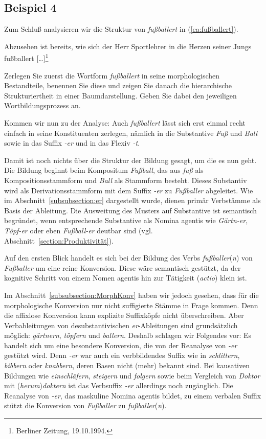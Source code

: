 \subsection{Beispiel 4}\label{subsection:Bsp4Wb}

Zum Schluß analysieren wir die Struktur von \textit{fußballert} in (\ref{ea:fußballert}).

\ea \label{ea:fußballert} Abzusehen ist bereits, wie sich der Herr Sportlehrer in die Herzen seiner Jungs fußballert [\ldots{}]\footnote{Berliner Zeitung, 19.10.1994.}
\z 

Zerlegen Sie zuerst die Wortform \textit{fußballert} in seine morphologischen Bestandteile, benennen Sie diese und zeigen Sie danach die hierarchische Strukturiertheit in einer Baumdarstellung. Geben Sie dabei den jeweiligen Wortbildungsprozess an.


Kommen wir nun zu der Analyse: Auch \textit{fußballert} lässt sich erst einmal recht einfach in seine Konstituenten zerlegen, nämlich in die Substantive \textit{Fuß} und \textit{Ball} sowie in das Suffix \textit{-er} und in das Flexiv \textit{-t}. 

Damit ist noch nichts über die Struktur der Bildung gesagt, um die es nun geht. Die Bildung beginnt beim Kompositum \textit{Fußball}, das aus \textit{fuß} als Kompositionsstammform und \textit{Ball} als Stammform besteht. Dieses Substantiv wird als Derivationsstammform mit dem  Suffix \textit{-er} zu \textit{Fußballer} abgeleitet. Wie im Abschnitt~\ref{subsubsection:er} dargestellt wurde, dienen primär Verbstämme als Basis der Ableitung. Die Ausweitung des Musters auf Substantive ist semantisch begründet, wenn entsprechende Substantive als Nomina agentis wie \textit{Gärtn-er}, \textit{Töpf-er} oder eben \textit{Fußball-er} deutbar sind (vgl. Abschnitt~\ref{section:Produktivität}). 

Auf den ersten Blick handelt es sich bei der Bildung des Verbs \textit{fußballer}(\textit{n}) von \textit{Fußballer} um eine reine Konversion. Diese wäre semantisch gestützt, da der kognitive Schritt von einem Nomen agentis hin zur Tätigkeit (\textit{actio}) klein ist.

Im Abschnitt~\ref{subsubsection:MorphKonv} haben wir jedoch gesehen, dass für die morphologische Konversion nur nicht suffigierte Stämme in Frage kommen. Denn die affixlose Konversion kann explizite Suffixköpfe nicht überschreiben. Aber Verbableitungen von desubstantivischen \textit{er}-Ableitungen sind grundsätzlich möglich: \textit{gärtnern}, \textit{töpfern} und \textit{ballern}. Deshalb schlagen wir Folgendes vor: Es handelt sich um eine besondere Konversion, die von der Reanalyse von \textit{-er} gestützt wird. Denn \textit{-er} war auch ein verbbildendes Suffix wie in \textit{schlittern}, \textit{bibbern} oder \textit{knabbern}, deren Basen nicht (mehr) bekannt sind. Bei kausativen Bildungen wie \textit{einschläfern}, \textit{steigern} und \textit{folgern} sowie beim Vergleich von \textit{Doktor} mit (\textit{herum})\textit{doktern} ist das Verbsuffix \textit{-er} allerdings noch zugänglich. Die Reanalyse von \textit{-er}, das maskuline Nomina agentis bildet, zu einem verbalen Suffix stützt die Konversion von \textit{Fußballer} zu \textit{fußballer}(\textit{n}).

